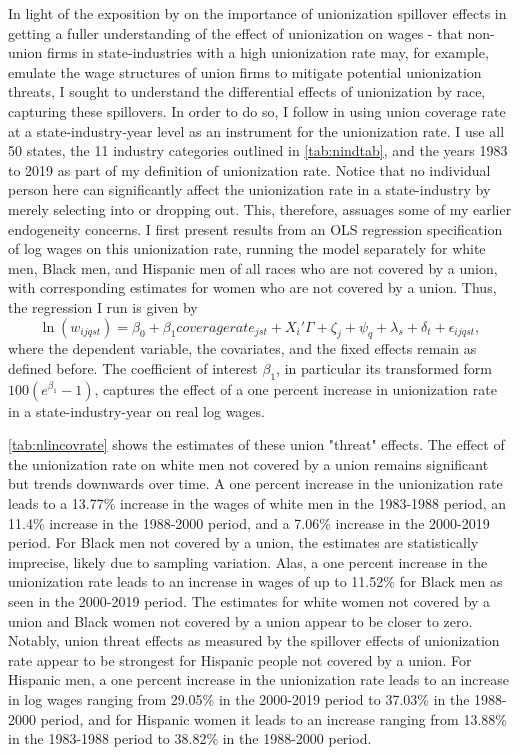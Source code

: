\documentclass[11pt]{article}
\begin{document}
In light of the exposition by \citet{fll2021} on the importance of unionization spillover effects in getting a fuller understanding of the effect of unionization on wages - that non-union firms in state-industries with a high unionization rate may, for example, emulate the wage structures of union firms to mitigate potential unionization threats, I sought to understand the differential effects of unionization by race, capturing these spillovers. In order to do so, I follow \citet{fll2021} in using union coverage rate at a state-industry-year level as an instrument for the unionization rate. I use all 50 states, the 11 industry categories outlined in \autoref{tab:nindtab}, and the years 1983 to 2019 as part of my definition of unionization rate. Notice that no individual person here can significantly affect the unionization rate in a state-industry by merely selecting into or dropping out. This, therefore, assuages some of my earlier endogeneity concerns. I first present results from an OLS regression specification of log wages on this unionization rate, running the model separately for white men, Black men, and Hispanic men of all races who are not covered by a union, with corresponding estimates for women who are not covered by a union. Thus, the regression I run is given by
\begin{equation}
   \ln(w_{ijqst}) = \beta_0 + \beta_1 coveragerate_{jst} + X_i'\Gamma + \zeta_j + \psi_q + \lambda_s + \delta_t + \epsilon_{ijqst}, 
\end{equation}
where the dependent variable, the covariates, and the fixed effects remain as defined before. The coefficient of interest $\beta_1$, in particular its transformed form $100(e^{\beta_1} - 1)$, captures the effect of a one percent increase in unionization rate in a state-industry-year on real log wages. 

\autoref{tab:nlincovrate} shows the estimates of these union "threat" effects. The effect of the unionization rate on white men not covered by a union remains significant but trends downwards over time. A one percent increase in the unionization rate leads to a 13.77\% increase in the wages of white men in the 1983-1988 period, an 11.4\% increase in the 1988-2000 period, and a 7.06\% increase in the 2000-2019 period. For Black men not covered by a union, the estimates are statistically imprecise, likely due to sampling variation. Alas, a one percent increase in the unionization rate leads to an increase in wages of up to 11.52\% for Black men as seen in the 2000-2019 period. The estimates for white women not covered by a union and Black women not covered by a union appear to be closer to zero. Notably, union threat effects as measured by the spillover effects of unionization rate appear to be strongest for Hispanic people not covered by a union. For Hispanic men, a one percent increase in the unionization rate leads to an increase in log wages ranging from 29.05\% in the 2000-2019 period to 37.03\% in the 1988-2000 period, and for Hispanic women it leads to an increase ranging from 13.88\% in the 1983-1988 period to 38.82\% in the 1988-2000 period.
\end{document}
